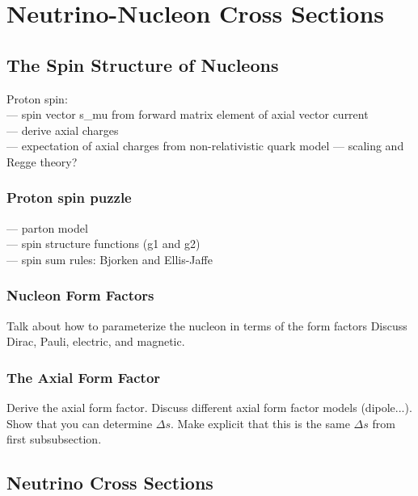 \section{Neutrino-Nucleon Cross Sections} \label{theory}
\hspace{\parindent}

\subsection{The Spin Structure of Nucleons}
  Proton spin: \\
  --- spin vector s\_mu from forward matrix element of axial vector current \\
  --- derive axial charges \\
  --- expectation of axial charges from non-relativistic quark model
  --- scaling and Regge theory?
  \subsubsection{Proton spin puzzle}
    --- parton model \\
    --- spin structure functions (g1 and g2) \\
    --- spin sum rules: Bjorken and Ellis-Jaffe \\
  \subsubsection{Nucleon Form Factors}
    Talk about how to parameterize the nucleon in terms of the form factors
    Discuss Dirac, Pauli, electric, and magnetic.
  \subsubsection{The Axial Form Factor}
    Derive the axial form factor. Discuss different axial form factor models
    (dipole...). Show that you can determine $\Delta s$. Make explicit that
    this is the same $\Delta s$ from first subsubsection.
  

\subsection{Neutrino Cross Sections}\label{probe}
